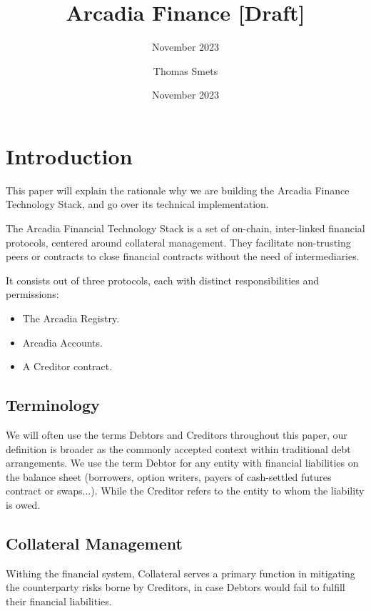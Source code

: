 \documentclass[sigconf,nonacm]{acmart}
\title{Arcadia Finance [Draft]}
\subtitle{November 2023}
\date{November 2023}
\author{Thomas Smets}
\affiliation{
    \institution{Arcadia Finance}
    \city{Brussels}
    \country{Belgium}
}
\begin{document}
\begin{abstract}
    \lipsum[1]
\end{abstract}


\maketitle

\section{Introduction} 
\label{sec:introduction}

This paper will explain the rationale why we are building the Arcadia Finance Technology Stack, and go over its technical implementation.

The Arcadia Financial Technology Stack is a set of on-chain, inter-linked financial protocols, centered around collateral management.
They facilitate non-trusting peers or contracts to close financial contracts without the need of intermediaries.

It consists out of three protocols, each with distinct responsibilities and permissions:
\begin{itemize}
\item The Arcadia Registry.
\item Arcadia Accounts.
\item A Creditor contract.
\end{itemize}

\subsection{Terminology}
We will often use the terms Debtors and Creditors throughout this paper, our definition is broader as the commonly accepted context within traditional debt arrangements.
We use the term Debtor for any entity with financial liabilities on the balance sheet (borrowers, option writers, payers of cash-settled futures contract or swaps...). 
While the Creditor refers to the entity to whom the liability is owed.

\subsection{Collateral Management}
Withing the financial system, Collateral serves a primary function in mitigating the counterparty risks borne by Creditors, in case Debtors would fail to fulfill their financial liabilities.
\end{document}
